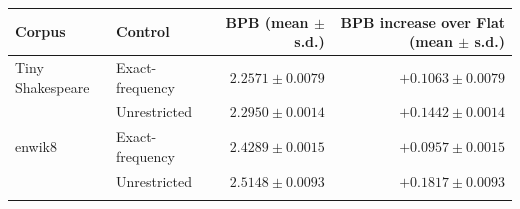 \begin{tabular}{llrr}
\toprule
Corpus & Control & BPB (mean $\pm$ s.d.) & BPB increase over Flat (mean $\pm$ s.d.) \\
\midrule
Tiny Shakespeare & Exact-frequency & $2.2571 \pm 0.0079$ & $+0.1063 \pm 0.0079$ \\
 & Unrestricted & $2.2950 \pm 0.0014$ & $+0.1442 \pm 0.0014$ \\
\addlinespace
enwik8 & Exact-frequency & $2.4289 \pm 0.0015$ & $+0.0957 \pm 0.0015$ \\
 & Unrestricted & $2.5148 \pm 0.0093$ & $+0.1817 \pm 0.0093$ \\
\addlinespace
\bottomrule
\end{tabular}
